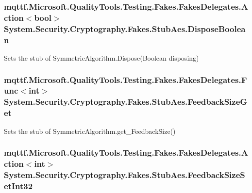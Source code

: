\hypertarget{class_system_1_1_security_1_1_cryptography_1_1_fakes_1_1_stub_aes_a74105e8d1a141d9169017f515e316f9f}{
\subsubsection[{Dispose\-Boolean}]{\setlength{\rightskip}{0pt plus 5cm}mqttf.\-Microsoft.\-Quality\-Tools.\-Testing.\-Fakes.\-Fakes\-Delegates.\-Action$<$bool$>$ System.\-Security.\-Cryptography.\-Fakes.\-Stub\-Aes.\-Dispose\-Boolean}}\label{class_system_1_1_security_1_1_cryptography_1_1_fakes_1_1_stub_aes_a74105e8d1a141d9169017f515e316f9f}


Sets the stub of Symmetric\-Algorithm.\-Dispose(\-Boolean disposing)

\hypertarget{class_system_1_1_security_1_1_cryptography_1_1_fakes_1_1_stub_aes_a3bbf076bd71f3b27db68d5e3b4d3332d}{
\subsubsection[{Feedback\-Size\-Get}]{\setlength{\rightskip}{0pt plus 5cm}mqttf.\-Microsoft.\-Quality\-Tools.\-Testing.\-Fakes.\-Fakes\-Delegates.\-Func$<$int$>$ System.\-Security.\-Cryptography.\-Fakes.\-Stub\-Aes.\-Feedback\-Size\-Get}}\label{class_system_1_1_security_1_1_cryptography_1_1_fakes_1_1_stub_aes_a3bbf076bd71f3b27db68d5e3b4d3332d}


Sets the stub of Symmetric\-Algorithm.\-get\-\_\-\-Feedback\-Size()

\hypertarget{class_system_1_1_security_1_1_cryptography_1_1_fakes_1_1_stub_aes_a811537e909fee8ae2cacf4d41438afff}{
\subsubsection[{Feedback\-Size\-Set\-Int32}]{\setlength{\rightskip}{0pt plus 5cm}mqttf.\-Microsoft.\-Quality\-Tools.\-Testing.\-Fakes.\-Fakes\-Delegates.\-Action$<$int$>$ System.\-Security.\-Cryptography.\-Fakes.\-Stub\-Aes.\-Feedback\-Size\-Set\-Int32}}\label{class_system_1_1_security_1_1_cryptography_1_1_fakes_1_1_stub_aes_a811537e909fee8ae2cacf4d41438afff}


